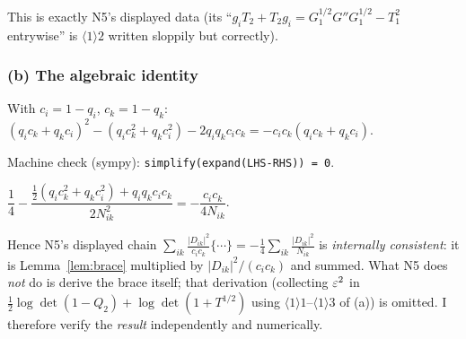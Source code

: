 \documentclass[11pt]{article}
\begin{document}
This is exactly N5's displayed data (its ``$g_iT_2+T_2g_i=G_1^{1/2}G''G_1^{1/2}-T_1^2$ entrywise''
is $\langle1\rangle2$ written sloppily but correctly).

\subsubsection*{(b) The algebraic identity}
\begin{lemma}\label{lem:alg}
With $c_i=1-q_i$, $c_k=1-q_k$:
$(q_ic_k+q_kc_i)^2-(q_ic_k^2+q_kc_i^2)-2q_iq_kc_ic_k=-c_ic_k(q_ic_k+q_kc_i)$.
\end{lemma}
Machine check (sympy): \verb|simplify(expand(LHS-RHS)) = 0|.

\begin{lemma}\label{lem:brace}
$\dfrac14-\dfrac{\tfrac12(q_ic_k^2+q_kc_i^2)+q_iq_kc_ic_k}{2N_{ik}^2}=-\dfrac{c_ic_k}{4N_{ik}}$.
\end{lemma}

Hence N5's displayed chain
$\sum_{ik}\frac{|D_{ik}|^2}{c_ic_k}\{\cdots\}=-\frac14\sum_{ik}\frac{|D_{ik}|^2}{N_{ik}}$ is
\emph{internally consistent}: it is Lemma~\ref{lem:brace} multiplied by $|D_{ik}|^2/(c_ic_k)$
and summed.  What N5 does \emph{not} do is derive the brace itself; that derivation (collecting
$\varepsilon^2$ in $\tfrac12\log\det(1-Q_2)+\log\det(1+T^{1/2})$ using
$\langle1\rangle1$--$\langle1\rangle3$ of (a)) is omitted.  I therefore verify the \emph{result}
independently and numerically.
\end{document}
